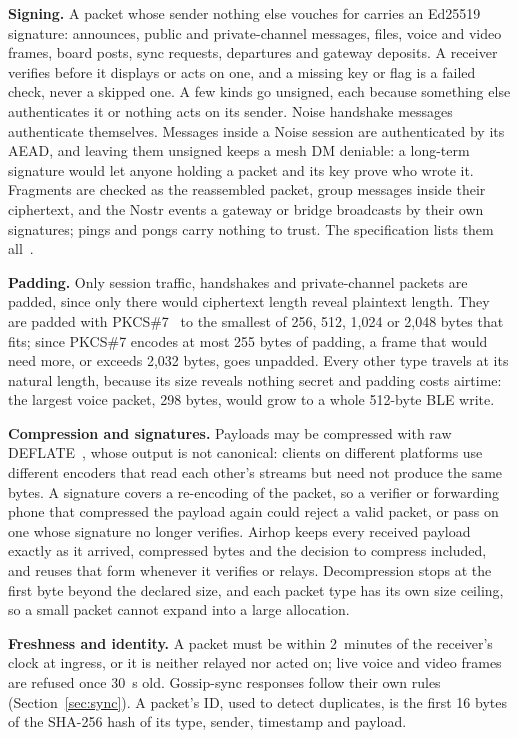 \documentclass[conference]{IEEEtran}
\begin{document}
\textbf{Signing.} A packet whose sender nothing else vouches for carries an Ed25519 signature: announces, public and private-channel messages, files, voice and video frames, board posts, sync requests, departures and gateway deposits. A receiver verifies before it displays or acts on one, and a missing key or flag is a failed check, never a skipped one. A few kinds go unsigned, each because something else authenticates it or nothing acts on its sender. Noise handshake messages authenticate themselves. Messages inside a Noise session are authenticated by its AEAD, and leaving them unsigned keeps a mesh DM deniable: a long-term signature would let anyone holding a packet and its key prove who wrote it. Fragments are checked as the reassembled packet, group messages inside their ciphertext, and the Nostr events a gateway or bridge broadcasts by their own signatures; pings and pongs carry nothing to trust. The specification lists them all~\cite{airhopspec}.

\textbf{Padding.} Only session traffic, handshakes and private-channel packets are padded, since only there would ciphertext length reveal plaintext length. They are padded with PKCS\#7~\cite{rfc5652} to the smallest of 256, 512, 1,024 or 2,048 bytes that fits; since PKCS\#7 encodes at most 255 bytes of padding, a frame that would need more, or exceeds 2,032 bytes, goes unpadded. Every other type travels at its natural length, because its size reveals nothing secret and padding costs airtime: the largest voice packet, 298 bytes, would grow to a whole 512-byte BLE write.

\textbf{Compression and signatures.} Payloads may be compressed with raw DEFLATE~\cite{rfc1951}, whose output is not canonical: clients on different platforms use different encoders that read each other's streams but need not produce the same bytes. A signature covers a re-encoding of the packet, so a verifier or forwarding phone that compressed the payload again could reject a valid packet, or pass on one whose signature no longer verifies. Airhop keeps every received payload exactly as it arrived, compressed bytes and the decision to compress included, and reuses that form whenever it verifies or relays. Decompression stops at the first byte beyond the declared size, and each packet type has its own size ceiling, so a small packet cannot expand into a large allocation.

\textbf{Freshness and identity.} A packet must be within 2~minutes of the receiver's clock at ingress, or it is neither relayed nor acted on; live voice and video frames are refused once 30~s old. Gossip-sync responses follow their own rules (Section~\ref{sec:sync}). A packet's ID, used to detect duplicates, is the first 16 bytes of the SHA-256 hash of its type, sender, timestamp and payload.
\end{document}
